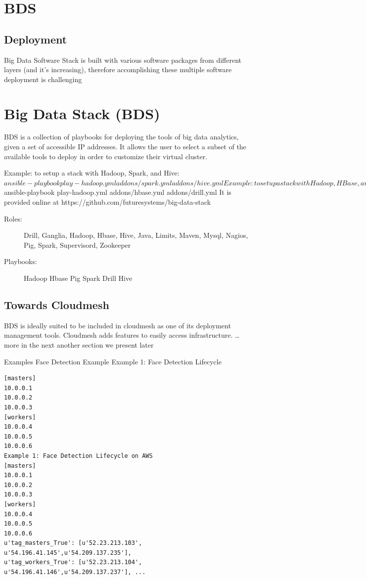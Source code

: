 {\section{BDS}

\subsection{Deployment}

Big Data Software Stack is built with various software packages from different layers (and it’s increasing), therefore accomplishing these multiple software deployment is challenging



\section{Big Data Stack (BDS)}

BDS is a collection of playbooks for deploying the tools of big data analytics, given a set of accessible IP addresses. It allows the user to select a subset of the available tools to deploy in order to customize their virtual cluster.

Example: to setup a stack with Hadoop, Spark, and Hive:
$ ansible-playbook play-hadoop.yml addons/spark.yml addons/hive.yml
Example: to setup a stack with Hadoop, HBase, and Drill:
$ ansible-playbook play-hadoop.yml addons/hbase.yml addons/drill.yml
It is provided online at https://github.com/futuresystems/big-data-stack

\begin{description}

\item[Roles:]
Drill,
Ganglia,
Hadoop,
Hbase,
Hive,
Java,
Limits,
Maven,
Mysql,
Nagios,
Pig,
Spark,
Supervisord,
Zookeeper

\item[Playbooks:]
Hadoop
Hbase
Pig
Spark
Drill
Hive
\end{description}

\subsection{Towards Cloudmesh}
BDS is ideally suited to be included in cloudmesh as one of its deployment management tools. Cloudmesh adds features to easily access infrastructure.
  … more in the next another section we present later

Examples
Face Detection Example
Example 1: Face Detection Lifecycle
\begin{Verbatim}
[masters]
10.0.0.1
10.0.0.2
10.0.0.3
[workers]
10.0.0.4
10.0.0.5
10.0.0.6
Example 1: Face Detection Lifecycle on AWS
[masters]
10.0.0.1
10.0.0.2
10.0.0.3
[workers]
10.0.0.4
10.0.0.5
10.0.0.6
u'tag_masters_True': [u'52.23.213.103', u'54.196.41.145',u'54.209.137.235'],
u'tag_workers_True': [u'52.23.213.104', u'54.196.41.146',u'54.209.137.237'], ...
\end{Verbatim}

}
